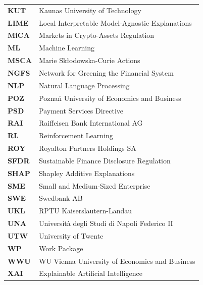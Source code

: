 \begin{longtable}{@{} >{\bfseries\sffamily}l @{\hspace{12mm}} l @{}}
  KUT   & Kaunas University of Technology \\[3pt]
  LIME  & Local Interpretable Model-Agnostic Explanations \\[3pt]
  MiCA  & Markets in Crypto-Assets Regulation \\[3pt]
  ML    & Machine Learning \\[3pt]
  MSCA  & Marie Sk\l{}odowska-Curie Actions \\[3pt]
  NGFS  & Network for Greening the Financial System \\[3pt]
  NLP   & Natural Language Processing \\[3pt]
  POZ   & Pozna\'{n} University of Economics and Business \\[3pt]
  PSD   & Payment Services Directive \\[3pt]
  RAI   & Raiffeisen Bank International AG \\[3pt]
  RL    & Reinforcement Learning \\[3pt]
  ROY   & Royalton Partners Holdings SA \\[3pt]
  SFDR  & Sustainable Finance Disclosure Regulation \\[3pt]
  SHAP  & Shapley Additive Explanations \\[3pt]
  SME   & Small and Medium-Sized Enterprise \\[3pt]
  SWE   & Swedbank AB \\[3pt]
  UKL   & RPTU Kaiserslautern-Landau \\[3pt]
  UNA   & Universit\`a degli Studi di Napoli Federico II \\[3pt]
  UTW   & University of Twente \\[3pt]
  WP    & Work Package \\[3pt]
  WWU   & WU Vienna University of Economics and Business \\[3pt]
  XAI   & Explainable Artificial Intelligence \\
\end{longtable}

\newpage

